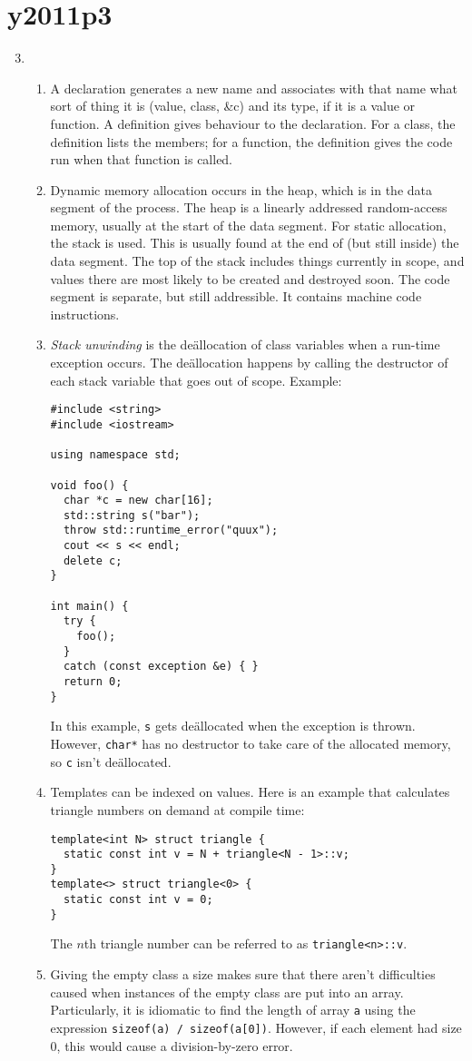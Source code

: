 \documentclass{article}
\begin{document}
\section*{y2011p3}
\begin{enumerate}
\setcounter{enumi}{2}
  \item
    \begin{enumerate}
      \item A declaration generates a new name and associates with that name what sort of thing it is (value, class, \&c) and its type, if it is a value or function. A definition gives behaviour to the declaration. For a class, the definition lists the members; for a function, the definition gives the code run when that function is called.
      \item Dynamic memory allocation occurs in the heap, which is in the data segment of the process. The heap is a linearly addressed random-access memory, usually at the start of the data segment. For static allocation, the stack is used. This is usually found at the end of (but still inside) the data segment. The top of the stack includes things currently in scope, and values there are most likely to be created and destroyed soon. The code segment is separate, but still addressible. It contains machine code instructions.
      \item \textit{Stack unwinding} is the de\"allocation of class variables when a run-time exception occurs. The de\"allocation happens by calling the destructor of each stack variable that goes out of scope. Example:
        \begin{lstlisting}
#include <string>
#include <iostream>

using namespace std;

void foo() {
  char *c = new char[16];
  std::string s("bar");
  throw std::runtime_error("quux");
  cout << s << endl;
  delete c;
}

int main() {
  try {
    foo();
  }
  catch (const exception &e) { }
  return 0;
}
        \end{lstlisting}
        In this example, \texttt{s} gets de\"allocated when the exception is thrown. However, \texttt{char*} has no destructor to take care of the allocated memory, so \texttt{c} isn't de\"allocated.
      \item Templates can be indexed on values. Here is an example that calculates triangle numbers on demand at compile time:
        \begin{lstlisting}
template<int N> struct triangle {
  static const int v = N + triangle<N - 1>::v;
}
template<> struct triangle<0> {
  static const int v = 0;
}
        \end{lstlisting}
        The $n$th triangle number can be referred to as \texttt{triangle<n>::v}.
      \item Giving the empty class a size makes sure that there aren't difficulties caused when instances of the empty class are put into an array. Particularly, it is idiomatic to find the length of array \texttt{a} using the expression \texttt{sizeof(a) / sizeof(a[0])}. However, if each element had size 0, this would cause a division-by-zero error.
    \end{enumerate}
\end{enumerate}
\end{document}
